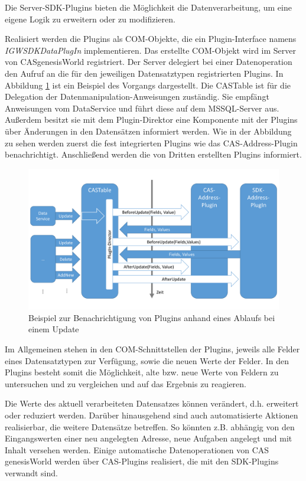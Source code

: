 Die Server-SDK-Plugins bieten die Möglichkeit die Datenverarbeitung, um eine eigene Logik zu erweitern oder zu modifizieren. 

Realisiert werden die Plugins als COM-Objekte, die ein Plugin-Interface namens \textit{IGWSDKDataPlugIn} implementieren. Das erstellte COM-Objekt wird im Server von CASgenesisWorld registriert. Der Server delegiert bei einer Datenoperation den Aufruf an die für den jeweiligen Datensatztypen registrierten Plugins. In Abbildung \ref{gw_plugin} ist ein Beispiel des Vorgangs dargestellt. Die CASTable ist für die Delegation der Datenmanipulation-Anweisungen zuständig. Sie empfängt Anweisungen vom DataService und führt diese auf dem MSSQL-Server aus. Außerdem besitzt sie mit dem Plugin-Direktor eine Komponente mit der Plugins über Änderungen in den Datensätzen informiert werden. Wie in der Abbildung zu sehen werden zuerst die fest integrierten Plugins wie das CAS-Address-Plugin benachrichtigt. Anschließend werden die von Dritten erstellten Plugins informiert.

\begin{figure}[H]
	\centering
  \includegraphics[width=1.0\textwidth, width=1.0\textwidth]{pics/analyse_plugins.pdf}
	\caption{Beispiel zur Benachrichtigung von Plugins anhand eines Ablaufs bei einem Update}
	\label{gw_plugin}
\end{figure}

Im Allgemeinen stehen in den COM-Schnittstellen der Plugins, jeweils alle Felder eines Datensatztypen zur Verfügung, sowie die neuen Werte der Felder. In den Plugins besteht somit die Möglichkeit, alte bzw. neue Werte von Feldern zu untersuchen und zu vergleichen und auf das Ergebnis zu reagieren.

Die Werte des aktuell verarbeiteten Datensatzes können verändert, d.h. erweitert oder reduziert werden. Darüber hinausgehend sind auch automatisierte Aktionen realisierbar, die weitere Datensätze betreffen. So könnten z.B. abhängig von den Eingangswerten einer neu angelegten Adresse, neue Aufgaben angelegt und mit Inhalt versehen werden. Einige automatische Datenoperationen von CAS genesisWorld werden über CAS-Plugins realisiert, die mit den SDK-Plugins verwandt sind.

